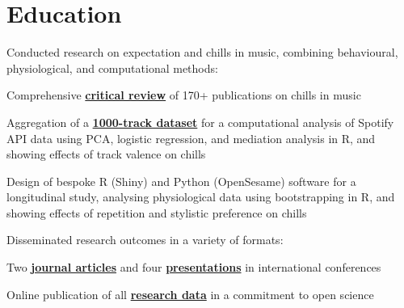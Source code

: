\documentclass[]{deedy-resume-openfont}
\begin{document}
\begin{minipage}[t]{0.66\textwidth} 

\section{Education} 


Conducted research on expectation and chills in music, combining behavioural, physiological, and computational methods:
\vspace{\topsep} %

\begin{tightemize}
\item Comprehensive \href{https://remidefleurian.com/publication/2020-psyarxiv/}{\bf critical review} of 170+ publications on chills in music
\item Aggregation of a \href{https://osf.io/uyg7m/wiki/home/}{\bf 1000-track dataset} for a {computational analysis} of Spotify API data using PCA, logistic regression, and mediation analysis in R, and showing effects of track valence on chills
\item Design of bespoke R (Shiny) and Python (OpenSesame) {software} for a {longitudinal study}, analysing {physiological data} using bootstrapping in R, and showing effects of repetition and stylistic preference on chills
\end{tightemize}

Disseminated research outcomes in a variety of formats:
\begin{tightemize}
\item Two \href{https://remidefleurian.com/#publications}{\bf journal articles} and four \href{https://remidefleurian.com/#presentations}{\bf presentations} in international conferences
\item Online publication of all \href{https://osf.io/f2jgd/}{\bf research data} in a commitment to open science
\end{tightemize}


\end{minipage}
\end{document}
